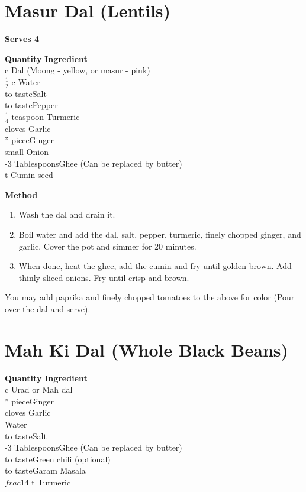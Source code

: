 \section{Masur Dal (Lentils)}
{\bf Serves 4}

\begin{tabbing}
\hspace{1.0cm}  \={\bf Quantity}   \hspace{3.0cm} \={\bf Ingredient}\\
 c \>Dal (Moong - yellow, or masur - pink)\\ 
 $\frac{1}{2}$ c \>Water\\
\>to taste\>Salt \\
\>to taste\>Pepper      \\
\>$\frac{1}{4}$ teaspoon \>Turmeric\\
 cloves \>Garlic\\
'' piece\>Ginger\\
 small \>Onion\\
-3 Tablespoons\>Ghee (Can be replaced by butter)\\
 t \>Cumin seed\\
\end{tabbing}

{\bf Method}
\begin{enumerate}
\item Wash the dal and drain it.
\item Boil water and add the dal, salt, pepper, turmeric, finely chopped
ginger, and garlic.  Cover the pot and simmer for 20 minutes.
\item When done, heat the ghee, add the cumin and fry until golden brown. Add
thinly sliced onions.  Fry until crisp and brown.
\end{enumerate}
   You may add paprika and finely chopped tomatoes to the above for color (Pour
over the dal and serve).

\section{Mah Ki Dal (Whole Black Beans)}

\begin{tabbing}
\hspace{1.0cm}  \={\bf Quantity}   \hspace{3.0cm} \={\bf Ingredient}\\
 c \>Urad or Mah dal\\
'' piece\>Ginger\\
 cloves \>Garlic\\
\>\>Water\\
\>to taste\>Salt        \\
-3 Tablespoons\>Ghee (Can be replaced by butter)\\
\>to taste\>Green chili (optional)\\
\>to taste\>Garam Masala\\
\>$frac{1}{4}$ t\>  Turmeric\\
\end{tabbing}

